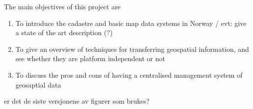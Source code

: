 





The main objectives of this project are
\begin{enumerate}
\item To introduce the cadastre and basic map data systems in Norway / evt: give a state of the art description (?)
\item To give an overview of techniques for transferring geospatial information, and see whether they are platform independent or not
\item To discuss the pros and cons of having a centralised management system of geosaptial data
\end{enumerate}




\todo er det de siste versjonene av figurer som brukes?




